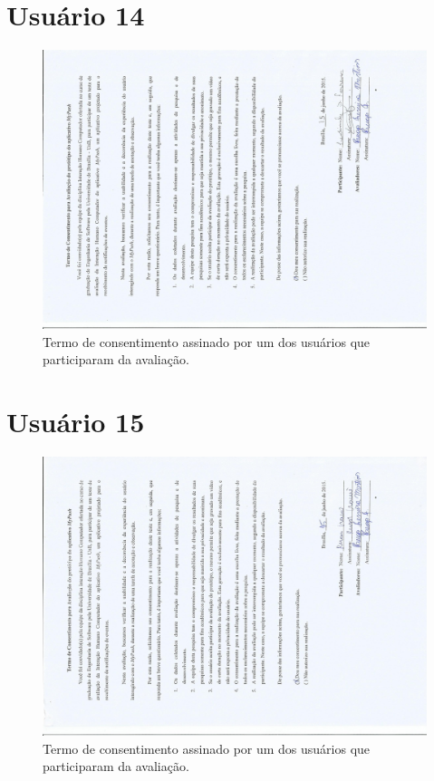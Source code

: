 \begin{anexosenv}
	
	 \section*{Usuário 14}
    \begin{figure}[!htbp]
      \centering
      \includegraphics[scale=0.6, angle=-90]{editaveis/figuras/ludimila}
      \caption{Termo de consentimento assinado por um dos usuários que participaram da avaliação.}
      \label{termo_consentimento_1}
    \end{figure}
	
	
	 \section*{Usuário 15}
    \begin{figure}[!htbp]
      \centering
      \includegraphics[scale=0.6, angle=-90]{editaveis/figuras/ruan}
      \caption{Termo de consentimento assinado por um dos usuários que participaram da avaliação.}
      \label{termo_consentimento_1}
    \end{figure}
    

\end{anexosenv}
